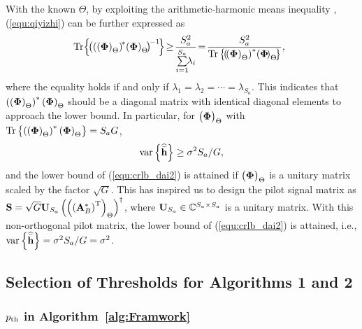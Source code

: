 \documentclass[final]{IEEEtran}
\begin{document}
 With the known $\Theta$, by exploiting the arithmetic-harmonic means inequality \cite{LS},
 (\ref{equ:qiyizhi}) can be further expressed as
\begin{align}\label{equ:crlb_dai1} %
\!\!\! {\rm{Tr}}\!\left\{\! \left( \left( \left( {\bf{\Phi}} \right)_{\Theta}\right)^{\!*}\!\left( {\bf{\Phi}}
 \right)_{\Theta}\! \right)^{\!-1} \!\right\} \!\ge\! \frac{S_a^2}{\sum\limits_{i=1}^{S_a}\!\! \lambda_i} \!=\!
 \frac{S_a^2}{{\rm{Tr}}\left\{\! \left(\! \left( {\bf{\Phi}} \right)_{\Theta}\right)^{*}\!
 \left( {\bf{\Phi}}\!\right)_{\Theta}\!\right\} },
\end{align}
 where the equality holds if and only if $\lambda_1=\lambda_2= \cdots =\lambda_{S_a}$. This
 indicates that $\left(\left({\bf{\Phi}}\right)_{\Theta}\right)^*\left({\bf{\Phi}}\right)_{\Theta}$
 should be a diagonal matrix with identical diagonal elements to approach the lower bound. In
 particular, for $\big({\bf{\Phi}}\big)_{\Theta}$ with ${\rm{Tr}}\left\{ \left( \left(
 {\bf{\Phi}} \right)_{\Theta}\right)^{*}\left( {\bf{\Phi}}\right)_{\Theta} \right\}=S_a G$,
\begin{align}\label{equ:crlb_dai2}  %
 {\rm{var}} \left\{ \widehat{\bar{\bf h}} \right\} \ge {\sigma^2 S_a}/{G} ,
\end{align}
 and the lower bound of (\ref{equ:crlb_dai2}) is attained if $\big({\bf{\Phi}}\big)_{\Theta}$
 is a unitary matrix scaled by the factor $\sqrt{G}$. This has inspired us to design the pilot
 signal matrix as ${\bf S}=\sqrt{G} {\bf U}_{S_a} \left(\left(\left( {\bf A}_B^{*}\right)^{\rm T}
 \right)_{\Theta}\right)^{\dag}$, where ${\bf U}_{S_a}\in \mathbb{C}^{S_a \times S_a}$ is a
 unitary matrix. With this non-orthogonal pilot matrix, the lower bound of (\ref{equ:crlb_dai2})
 is attained, i.e., ${\rm{var}}\left\{ \widehat{\bar{\bf h}} \right\} =\sigma^2 S_a/G=\sigma^2$.

\subsection{Selection of Thresholds for Algorithms 1 and 2}\label{S4.7}

\subsubsection{$p_{\rm{th}}$ in Algorithm~\ref{alg:Framwork}}\label{S4.7.1}
\end{document}
